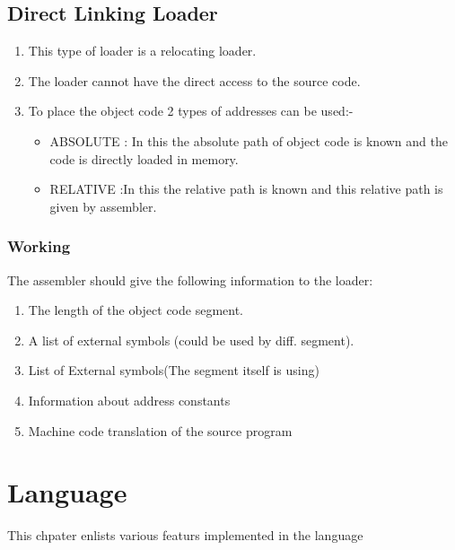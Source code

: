 \documentclass{scrreprt}
\begin{document}
\section{Direct Linking Loader}
\begin{enumerate}
\item This type of loader is a relocating loader.
\item  The loader cannot have the direct access to the source
code.
\item To place the object code 2 types of addresses can be
used:-
\begin{itemize}
\item ABSOLUTE : In this the absolute path of object code is
known and the code is directly loaded in memory.
\item RELATIVE :In this the relative path is known and this
relative path is given by assembler.
\end{itemize}


\end{enumerate}


\subsection{Working}
The assembler should give the following information to the
loader:
\begin{enumerate}
\item The length of the object code segment.
\item A list of external symbols (could be used by diff.
segment).
\item List of External symbols(The segment itself is using)
\item Information about address constants
\item Machine code translation of the source program
\end{enumerate}


\chapter{Language}
This chpater enlists various featurs implemented in the language
\end{document}
